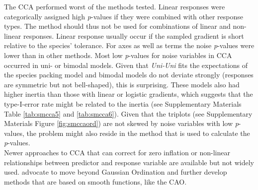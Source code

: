 	The CCA performed worst of the methods tested. 
	Linear responses were categorically assigned high \textit{p}-values if they were combined with other response types. 
	The method should thus not be used for combinations of linear and non-linear responses.
	Linear response usually occur if the sampled gradient is short relative to the species' tolerance. 
	For axes as well as terms the noise \textit{p}-values were lower than in other methods.
	Most low \textit{p}-values for noise variables in CCA occurred in uni- or bimodal models. 
	Given that \textit{Uni-Uni} fits the expectations of the species packing model and bimodal models do not deviate strongly (responses are symmetric but not bell-shaped), this is surprising.
	These models also had higher inertia than those with linear or logistic gradients, which suggests that the type-I-error rate might be related to the inertia (see Supplementary Materials Table \ref{tab:smcca5} and \ref{tab:smcca6}). 
	Given that the triplots (see Supplementary Materials Figure \ref{fig:smccaord}) are not skewed by noise variables with low \textit{p}-values, the problem might also reside in the method that is used to calculate the \textit{p}-values. \\
	Newer approaches to CCA that can correct for zero inflation \citep{Zhang2012} or non-linear relationships between predictor and response variable \citep{Makarenkov2002} are available but not widely used.  \citet{TerBraak2015} advocate to move beyond Gaussian Ordination and further develop methods that are based on smooth functions, like the CAO. \\

